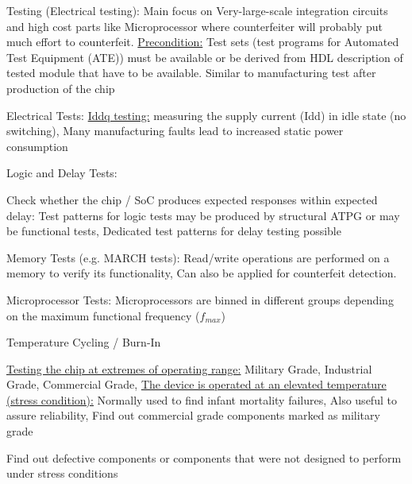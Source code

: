 \documentclass[landscape, a4paper]{article}
\begin{document}
\begin{minipage}[t]{0.2\linewidth}
\begin{betterlist}
\begin{betterlist}
\begin{betterlist}
			\end{betterlist}
			\item \alert{Testing (Electrical testing):} Main focus on Very-large-scale integration circuits and high cost parts like Microprocessor where counterfeiter will probably put much effort to counterfeit. \underline{Precondition:} Test sets (test programs for Automated Test Equipment (ATE)) must be available or be derived from HDL description of tested module that have to be available. Similar to manufacturing test after production of the chip
			\begin{betterlist}
				\item \alert{Electrical Tests:} \underline{Iddq testing:} measuring the supply current (Idd) in idle state (no switching), Many manufacturing faults lead to increased static power consumption
				\item \alert{Logic and Delay Tests:}
				\begin{betterlist}
					\item \alert{Check whether the chip / SoC produces expected responses within expected delay:} Test patterns for logic tests may be produced by structural ATPG or may be functional tests, Dedicated test patterns for delay testing possible
					\item \alert{Memory Tests (e.g. MARCH tests):} Read/write operations are performed on a memory to verify its functionality, Can also be applied for counterfeit detection.
					\item \alert{Microprocessor Tests:} Microprocessors are binned in different groups depending on the maximum functional frequency ($f_{max}$)
				\end{betterlist}
				\item \alert{Temperature Cycling / Burn-In}
				\begin{betterlist}
					\item \underline{Testing the chip at extremes of operating range:} Military Grade, Industrial Grade, Commercial Grade, \uline{The device is operated at an elevated temperature (stress condition):} Normally used to find infant mortality failures, Also useful to assure reliability, Find out commercial grade components marked as military grade
					\item Find out defective components or components that were not designed to perform under stress conditions
				\end{betterlist}
			\end{betterlist}
		\end{betterlist}

\end{betterlist}
\end{minipage}
\end{document}
